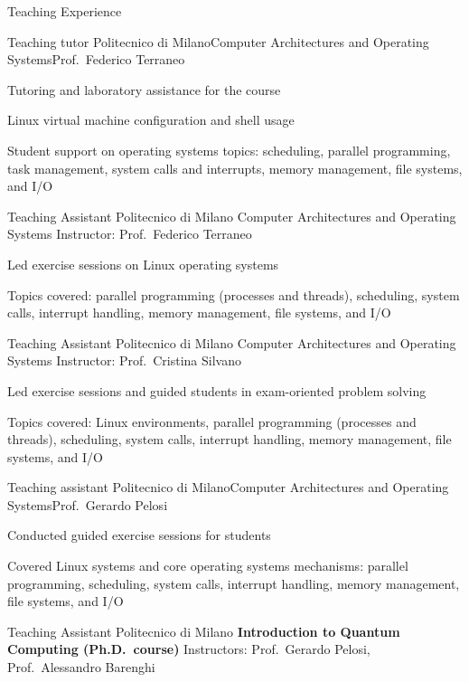 \documentclass[
	a4paper, %
	10pt, %
]{tresume} %
\begin{document}
\begin{tSection}{Teaching Experience}
  \begin{tSubsection}{Teaching tutor \textemdash{} Politecnico di Milano}{}{Computer Architectures and
      Operating Systems}{Prof.\ Federico Terraneo}
    \item Tutoring and laboratory assistance for the course
    \item Linux virtual machine configuration and shell usage
    \item Student support on operating systems topics: scheduling, parallel
      programming, task management, system calls and interrupts, memory
      management, file systems, and I/O
    \end{tSubsection}
    \begin{tSubsection}{Teaching Assistant \textemdash{} Politecnico di Milano}
      {}
      {Computer Architectures and Operating Systems}
      {Instructor: Prof.\ Federico Terraneo}
    \item Led exercise sessions on Linux operating systems
    \item Topics covered: parallel programming (processes and threads),
      scheduling, system calls, interrupt handling, memory management,
      file systems, and I/O
    \end{tSubsection}
    \begin{tSubsection}{Teaching Assistant \textemdash{} Politecnico di Milano}
{}
{Computer Architectures and Operating Systems}
{Instructor: Prof.\ Cristina Silvano}

\item Led exercise sessions and guided students in exam-oriented problem solving
\item Topics covered: Linux environments, parallel programming (processes and threads),
scheduling, system calls, interrupt handling, memory management,
file systems, and I/O
\end{tSubsection}
  \begin{tSubsection}{Teaching assistant \textemdash{} Politecnico di Milano}{}{Computer Architectures and Operating Systems}{Prof.\ Gerardo Pelosi}
  \item Conducted guided exercise sessions for students
  \item Covered Linux systems and core operating systems mechanisms:
      parallel programming, scheduling, system calls, interrupt handling,
      memory management, file systems, and I/O
  \end{tSubsection}
\begin{tSubsection}{Teaching Assistant \textemdash{} Politecnico di Milano}
{}
{\textbf{Introduction to Quantum Computing (Ph.D.\ course)}}
{Instructors: Prof.\ Gerardo Pelosi, Prof.\ Alessandro Barenghi}


\end{tSubsection}
\end{tSection}
\end{document}
